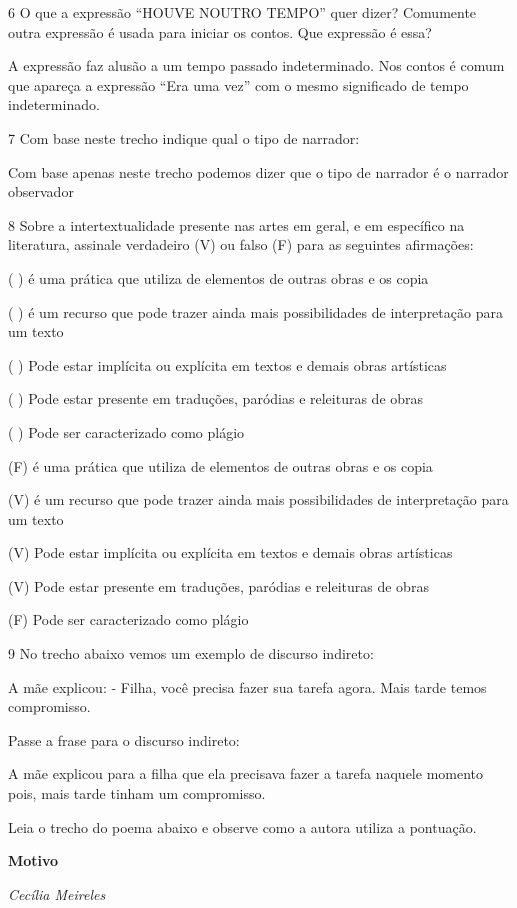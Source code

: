{{\begin{escolha}
\num{6} O que a expressão ``HOUVE NOUTRO TEMPO'' quer dizer? Comumente outra
  expressão é usada para iniciar os contos. Que expressão é essa?

A expressão faz alusão a um tempo passado indeterminado. Nos contos é
comum que apareça a expressão ``Era uma vez'' com o mesmo significado de
tempo indeterminado.

\num{7} Com base neste trecho indique qual o tipo de narrador:

Com base apenas neste trecho podemos dizer que o tipo de narrador é o
narrador observador

\num{8} Sobre a intertextualidade presente nas artes em geral, e em específico
  na literatura, assinale verdadeiro (V) ou falso (F) para as seguintes
  afirmações:

( ) é uma prática que utiliza de elementos de outras obras e os copia


( ) é um recurso que pode trazer ainda mais possibilidades de
interpretação para um texto


( ) Pode estar implícita ou explícita em textos e demais obras
artísticas

( ) Pode estar presente em traduções, paródias e releituras de obras


( ) Pode ser caracterizado como plágio


(F) é uma prática que utiliza de elementos de outras obras e os copia


(V) é um recurso que pode trazer ainda mais possibilidades de
interpretação para um texto


(V) Pode estar implícita ou explícita em textos e demais obras
artísticas

(V) Pode estar presente em traduções, paródias e releituras de obras


(F) Pode ser caracterizado como plágio


\num{9} No trecho abaixo vemos um exemplo de discurso indireto:

A mãe explicou: - Filha, você precisa fazer sua tarefa agora. Mais tarde
temos compromisso.

Passe a frase para o discurso indireto:

A mãe explicou para a filha que ela precisava fazer a tarefa naquele
momento pois, mais tarde tinham um compromisso.

Leia o trecho do poema abaixo e observe como a autora utiliza a
pontuação.

\textbf{Motivo}

\emph{Cecília Meireles}


\end{escolha}}}
